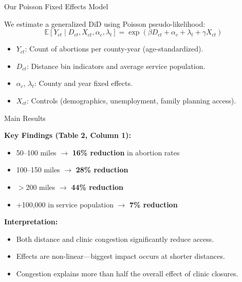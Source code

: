 \documentclass{beamer}
\begin{document}
\begin{frame}{Our Poisson Fixed Effects Model}

We estimate a generalized DiD using Poisson pseudo-likelihood:
\[
\mathbb{E}[Y_{ct} \mid D_{ct}, X_{ct}, \alpha_c, \lambda_t] = \exp(\beta D_{ct} + \alpha_c + \lambda_t + \gamma X_{ct})
\]

\begin{itemize}
  \item $Y_{ct}$: Count of abortions per county-year (age-standardized).
  \item $D_{ct}$: Distance bin indicators and average service population.
  \item $\alpha_c$, $\lambda_t$: County and year fixed effects.
  \item $X_{ct}$: Controls (demographics, unemployment, family planning access).
\end{itemize}

\medskip

\end{frame}

\begin{frame}{Main Results}

\textbf{Key Findings (Table 2, Column 1):}
\begin{itemize}
  \item 50–100 miles $\rightarrow$ \textbf{16\% reduction} in abortion rates
  \item 100–150 miles $\rightarrow$ \textbf{28\% reduction}
  \item $>$200 miles $\rightarrow$ \textbf{44\% reduction}
  \item +100,000 in service population $\rightarrow$ \textbf{7\% reduction}
\end{itemize}

\medskip

\textbf{Interpretation:}
\begin{itemize}
  \item Both distance and clinic congestion significantly reduce access.
  \item Effects are non-linear—biggest impact occurs at shorter distances.
  \item Congestion explains more than half the overall effect of clinic closures.
\end{itemize}

\end{frame}
\end{document}
